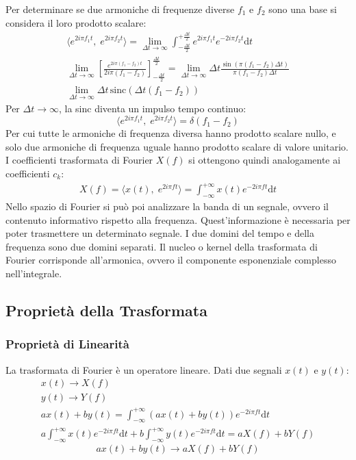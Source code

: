 \documentclass{article}
\newcommand{\sinc}{\mathrm{sinc}}
\newcommand{\df}{\mathrm{d}}
\numberwithin{equation}{subsection}
\begin{document}
Per determinare se due armoniche di frequenze diverse $f_1$ e $f_2$ sono una base si considera il loro prodotto scalare:
\begin{gather*}
    \langle e^{2i\pi f_1t},\;e^{2i\pi f_2t}\rangle=\displaystyle\lim_{\Delta t\to\infty}\int_{-\frac{\Delta t}{2}}^{+\frac{\Delta t}{2}}e^{2i\pi f_1t}e^{-2i\pi f_2t}\df t\\
    \displaystyle\lim_{\Delta t\to\infty}\left[\frac{e^{2i\pi(f_1-f_2)t}}{2i\pi(f_1-f_2)}\right]^{\frac{\Delta t}{2}}_{-\frac{\Delta t}{2}}=\lim_{\Delta t\to\infty}
    \Delta t\frac{\sin(\pi(f_1-f_2)\Delta t)}{\pi(f_1-f_2)\Delta t}\\
    \displaystyle\lim_{\Delta t\to\infty}\Delta t\,\sinc(\Delta t(f_1-f_2))
\end{gather*}
Per $\Delta t\to\infty$, la sinc diventa un impulso tempo continuo:
\begin{equation*}
    \langle e^{2i\pi f_1t},\;e^{2i\pi f_2t}\rangle=\delta(f_1-f_2)
\end{equation*}
Per cui tutte le armoniche di frequenza diversa hanno prodotto scalare nullo, e solo due armoniche di frequenza uguale hanno prodotto scalare di valore unitario. 
I coefficienti trasformata di Fourier $X(f)$ si ottengono quindi analogamente ai coefficienti $c_k$:
\begin{gather*}
    X(f)=\langle x(t),\;e^{2i\pi ft}\rangle=\displaystyle\int_{-\infty}^{+\infty}x(t)e^{-2i\pi ft}\df t
\end{gather*}
Nello spazio di Fourier si può poi analizzare la banda di un segnale, ovvero il contenuto informativo rispetto alla frequenza. Quest'informazione è necessaria per poter 
trasmettere un determinato segnale. I due domini del tempo e della frequenza sono due domini separati. 
Il nucleo o kernel della trasformata di Fourier corrisponde all'armonica, ovvero il componente esponenziale complesso nell'integrale. 

\subsection{Proprietà della Trasformata}

\subsubsection{Proprietà di Linearità}

La trasformata di Fourier è un operatore lineare. Dati due segnali $x(t)$ e $y(t)$:
\begin{gather*}
    x(t)\to X(f)\\
    y(t)\to Y(f)\\
    ax(t)+by(t)=\displaystyle\int_{-\infty}^{+\infty}(ax(t)+by(t))e^{-2i\pi ft}\df t\\
    a\int_{-\infty}^{+\infty}x(t)e^{-2i\pi ft}\df t+b\int_{-\infty}^{+\infty}y(t)e^{-2i\pi ft}\df t= 
    aX(f)+bY(f)
\end{gather*}
\begin{equation}
    ax(t)+by(t)\to aX(f)+bY(f)
\end{equation}
\end{document}
